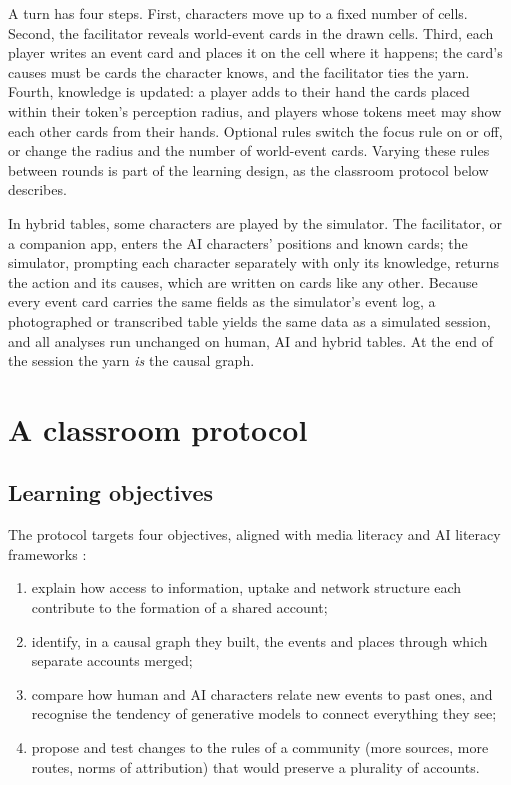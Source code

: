 \documentclass[12pt]{article}
\begin{document}
A turn has four steps. First, characters move up to a fixed number of cells.
Second, the facilitator reveals world-event cards in the drawn cells. Third,
each player writes an event card and places it on the cell where it happens;
the card's causes must be cards the character knows, and the facilitator
ties the yarn. Fourth, knowledge is updated: a player adds to their hand the
cards placed within their token's perception radius, and players whose
tokens meet may show each other cards from their hands. Optional rules
switch the focus rule on or off, or change the radius and the number of
world-event cards. Varying these rules between rounds is part of the
learning design, as the classroom protocol below describes.

In hybrid tables, some characters are played by the simulator. The
facilitator, or a companion app, enters the AI characters' positions and
known cards; the simulator, prompting each character separately with only
its knowledge, returns the action and its causes, which are written on cards
like any other. Because every event card carries the same fields as the
simulator's event log, a photographed or transcribed table yields the same
data as a simulated session, and all analyses run unchanged on human, AI and
hybrid tables. At the end of the session the yarn \emph{is} the causal graph.

\section{A classroom protocol}
\label{sec:aula}

\subsection{Learning objectives}

The protocol targets four objectives, aligned with media literacy and AI
literacy frameworks \parencite{hobbs2010,long2020,unesco2024}:

\begin{enumerate}
\item explain how access to information, uptake and network structure each
contribute to the formation of a shared account;
\item identify, in a causal graph they built, the events and places through
which separate accounts merged;
\item compare how human and AI characters relate new events to past ones, and
recognise the tendency of generative models to connect everything they see;
\item propose and test changes to the rules of a community (more sources,
more routes, norms of attribution) that would preserve a plurality of
accounts.
\end{enumerate}
\end{document}
